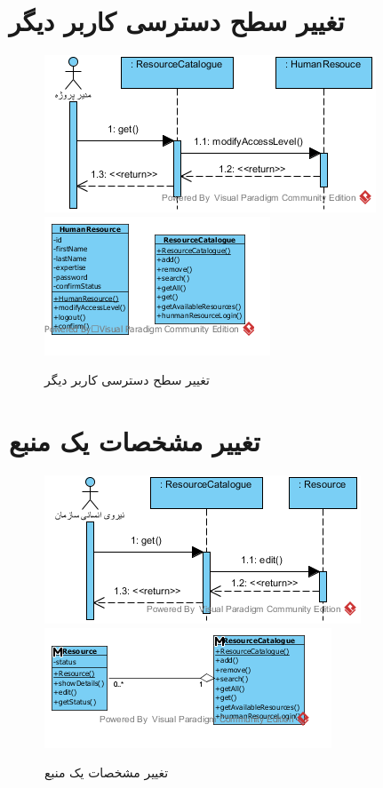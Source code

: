 \section{تغییر سطح دسترسی کاربر دیگر}
\begin{figure}[H]
	\centering
	\includegraphics[scale=0.8]{img/sequence-analysis/ChangeAccessLevel}
	\includegraphics[scale=0.8]{img/sequence-analysis/ChangeAccessLevelC}
	\caption{تغییر سطح دسترسی کاربر دیگر}
\end{figure}


\section{تغییر مشخصات یک منبع}
\begin{figure}[H]
	\centering
	\includegraphics[scale=0.9]{img/sequence-analysis/EditResourceAttributes}
	\includegraphics[scale=0.9]{img/sequence-analysis/EditResourceAttributesC}
	\caption{تغییر مشخصات یک منبع}
\end{figure}

